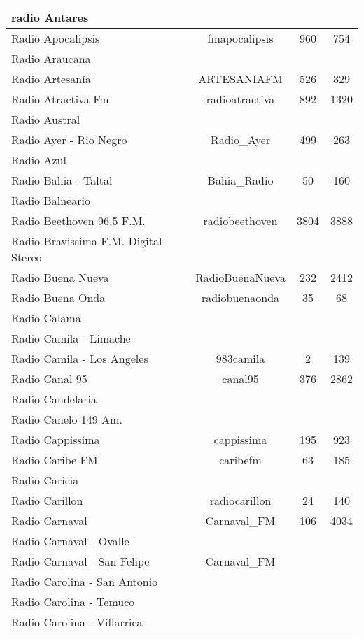 \begin{center}
\begin{longtable}{| l | c | c | c |}
radio Antares	&		&		&		\\ \hline
Radio Apocalipsis	&	fmapocalipsis	&	960	&	754	\\ \hline
Radio Araucana	&		&		&		\\ \hline
Radio Artesanía	&	ARTESANIAFM	&	526	&	329	\\ \hline
Radio Atractiva Fm	&	radioatractiva	&	892	&	1320	\\ \hline
Radio Austral	&		&		&		\\ \hline
Radio Ayer - Rio Negro	&	Radio\_Ayer	&	499	&	263	\\ \hline
Radio Azul	&		&		&		\\ \hline
Radio Bahia - Taltal	&	Bahia\_Radio	&	50	&	160	\\ \hline
Radio Balneario	&		&		&		\\ \hline
Radio Beethoven 96,5 F.M.	&	radiobeethoven	&	3804	&	3888	\\ \hline
Radio Bravissima F.M. Digital Stereo	&		&		&		\\ \hline
Radio Buena Nueva	&	RadioBuenaNueva	&	232	&	2412	\\ \hline
Radio Buena Onda	&	radiobuenaonda	&	35	&	68	\\ \hline
Radio Calama	&		&		&		\\ \hline
Radio Camila - Limache	&		&		&		\\ \hline
Radio Camila - Los Angeles	&	983camila	&	2	&	139	\\ \hline
Radio Canal 95	&	canal95	&	376	&	2862	\\ \hline
Radio Candelaria	&		&		&		\\ \hline
Radio Canelo 149 Am.	&		&		&		\\ \hline
Radio Cappissima	&	cappissima	&	195	&	923	\\ \hline
Radio Caribe FM	&	caribefm	&	63	&	185	\\ \hline
Radio Caricia	&		&		&		\\ \hline
Radio Carillon	&	radiocarillon	&	24	&	140	\\ \hline
Radio Carnaval	&	Carnaval\_FM	&	106	&	4034	\\ \hline
Radio Carnaval - Ovalle	&		&		&		\\ \hline
Radio Carnaval - San Felipe	&	Carnaval\_FM	&		&		\\ \hline
Radio Carolina - San Antonio	&		&		&		\\ \hline
Radio Carolina - Temuco	&		&		&		\\ \hline
Radio Carolina - Villarrica	&		&		&		\\ \hline

\end{longtable}
\end{center}
